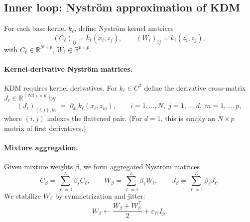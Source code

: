 \documentclass[11pt]{article}
\theoremstyle{remark}
\begin{document}
\subsection{Inner loop: Nystr\"om approximation of KDM}
\label{subsec:nystrom}

For each base kernel $k_\ell$, define Nystr\"om kernel matrices
\begin{equation}
(C_\ell)_{ij} = k_\ell(x_i,z_j), \qquad (W_\ell)_{ij}=k_\ell(z_i,z_j),
\label{eq:CW-ell}
\end{equation}
with $C_\ell\in\mathbb{R}^{N\times p}$, $W_\ell\in\mathbb{R}^{p\times p}$.

\paragraph{Kernel-derivative Nystr\"om matrices.}
KDM requires kernel derivatives.
For $k_\ell\in C^2$ define the derivative cross-matrix $J_\ell\in\mathbb{R}^{(Nd)\times p}$ by
\begin{equation}
(J_\ell)_{(i,j),m} \;=\; \partial_{x_j} k_\ell(x_i,z_m),
\qquad i=1,\dots,N,\; j=1,\dots,d,\; m=1,\dots,p,
\label{eq:J-ell}
\end{equation}
where $(i,j)$ indexes the flattened pair.
(For $d=1$, this is simply an $N\times p$ matrix of first derivatives.)

\paragraph{Mixture aggregation.}
Given mixture weights $\beta$, we form aggregated Nystr\"om matrices
\begin{equation}
C_\beta = \sum_{\ell=1}^L \beta_\ell C_\ell,
\qquad
W_\beta = \sum_{\ell=1}^L \beta_\ell W_\ell,
\qquad
J_\beta = \sum_{\ell=1}^L \beta_\ell J_\ell.
\label{eq:CWJ-beta}
\end{equation}
We stabilize $W_\beta$ by symmetrization and jitter:
\begin{equation}
W_\beta \leftarrow \frac{W_\beta+W_\beta^\top}{2} + \varepsilon_W I_p.
\label{eq:W-stab}
\end{equation}
\end{document}
